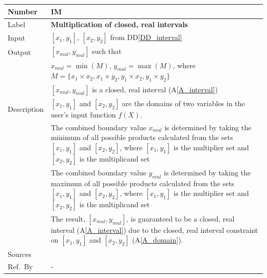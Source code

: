 \documentclass[12pt]{article}
\newcommand{\colAwidth}{0.13\textwidth}
\newcommand{\colBwidth}{0.82\textwidth}
\newcommand{\ddref}[1]{DD\ref{#1}}
\newcommand{\aref}[1]{A\ref{#1}}
\newcounter{instnum} %
\begin{document}
\noindent
\begin{minipage}{\textwidth}
	\renewcommand*{\arraystretch}{1.5}
	\begin{tabular}{| p{\colAwidth} | p{\colBwidth}|}
		\hline
		\rowcolor[gray]{0.9}
		Number& IM{instnum}\theinstnum \label{I_multiplication}\\
		\hline
		Label& \bf Multiplication of closed, real intervals\\
		\hline
		Input&$[x_{1}, y_{1}]$, $[x_{2}, y_{2}]$ from \ddref{DD_interval}\\
		\hline
		Output&$[x_{mul}, y_{mul}]$ such that\\
		&$x_{mul} = \min(M)$, $y_{mul} = \max(M)$, where $M = \{x_{1} \times 
		x_{2}, x_{1} \times y_{2}, y_{1} \times x_{2}, y_{1} \times y_{2}\}$\\
		&$[x_{mul}, y_{mul}]$ is a closed, real interval (\aref{A_interval}) \\
		\hline
		Description&$[x_{1}, y_{1}]$ and $[x_{2}, y_{2}]$ are the domains of 
		two variables in the user's input function $f(X)$. \\
		&The combined boundary value $x_{mul}$ is determined by taking the 
		minimum of all possible products calculated from the sets $[x_{1}, 
		y_{1}]$ and $[x_{2}, y_{2}]$, where $[x_{1}, y_{1}]$ is the 
		multiplier set and $[x_{2}, y_{2}]$ is the multiplicand set\\
		&The combined boundary value $y_{mul}$ is determined by taking the 
		maximum of all possible products calculated from the sets $[x_{1}, 
		y_{1}]$ and $[x_{2}, y_{2}]$, where $[x_{1}, y_{1}]$ is the 
		multiplier set and $[x_{2}, y_{2}]$ is the multiplicand set\\
		& The result, $[x_{mul}, y_{mul}]$, is guaranteed to be a closed, real 
		interval (\aref{A_interval}) due to the closed, real interval 
		constraint on $[x_{1}, y_{1}]$ and $[x_{2}, y_{2}]$ (\aref{A_domain}).
		\\
		\hline
		Sources& ~\cite{intervalarithmetic} \ \\
		\hline
		Ref.\ By & -\\
		\hline
	\end{tabular}
\end{minipage}\\

~\newline
\end{document}
